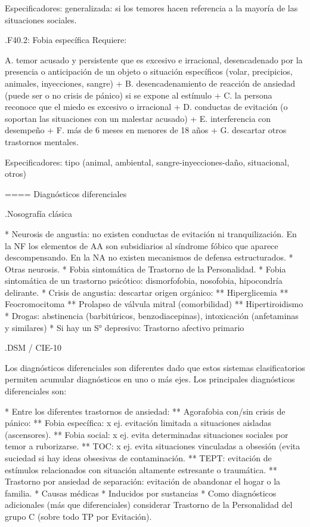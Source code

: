 \begin{itemize}
Especificadores: generalizada: si los temores hacen referencia a la mayoría de las situaciones sociales.

.F40.2: Fobia específica
Requiere:

A. temor acusado y persistente que es excesivo e irracional, desencadenado por la presencia o anticipación de un objeto o situación específicos (volar, precipicios, animales, inyecciones, sangre) +
B. desencadenamiento de reacción de ansiedad (puede ser o no crisis de pánico) si se expone al estímulo +
C. la persona reconoce que el miedo es excesivo o irracional +
D. conductas de evitación (o soportan las situaciones con un malestar acusado) +
E. interferencia con desempeño +
F. más de 6 meses en menores de 18 años +
G. descartar otros trastornos mentales.

Especificadores: tipo (animal, ambiental, sangre-inyecciones-daño, situacional, otros)

==== Diagnósticos diferenciales

.Nosografía clásica

* Neurosis de angustia: no existen conductas de evitación ni tranquilización. En la NF los elementos de AA son subsidiarios al síndrome fóbico que aparece descompensando. En la NA no existen mecanismos de defensa estructurados.
* Otras neurosis.
* Fobia sintomática de Trastorno de la Personalidad.
* Fobia sintomática de un trastorno psicótico: dismorfofobia, nosofobia, hipocondría delirante.
* Crisis de angustia: descartar origen orgánico:
** Hiperglicemia
** Feocromocitoma
** Prolapso de válvula mitral (comorbilidad)
** Hipertiroidismo
* Drogas: abstinencia (barbitúricos, benzodiacepinas), intoxicación (anfetaminas y similares)
* Si hay un S° depresivo: Trastorno afectivo primario

.DSM / CIE-10

Los diagnósticos diferenciales son diferentes dado que estos sistemas clasificatorios permiten acumular diagnósticos en uno o más ejes. Los principales diagnósticos diferenciales son:

* Entre los diferentes trastornos de ansiedad:
** Agorafobia con/sin crisis de pánico:
** Fobia específica: x ej. evitación limitada a situaciones aisladas (ascensores).
** Fobia social: x ej. evita determinadas situaciones sociales por temor a ruborizarse.
** TOC: x ej. evita situaciones vinculadas a obsesión (evita suciedad si hay ideas obsesivas de contaminación.
** TEPT: evitación de estímulos relacionados con situación altamente estresante o traumática.
** Trastorno por ansiedad de separación: evitación de abandonar el hogar o la familia.
* Causas médicas
* Inducidos por sustancias
* Como diagnósticos adicionales (más que diferenciales) considerar Trastorno de la Personalidad del grupo C (sobre todo TP por Evitación).


\end{itemize}
